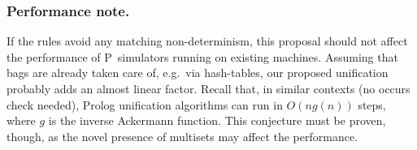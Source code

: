 \subsubsection{Performance note.}
If the rules avoid any matching non-determinism, 
this proposal should not affect the performance of P~simulators running on existing machines.
Assuming that bags are already taken care of, e.g.~via hash-tables,
our proposed unification probably adds an almost linear factor.
Recall that, in similar contexts (no occurs check needed), 
Prolog unification algorithms can run in \(O(n g(n))\) steps,
where \(g\) is the inverse Ackermann function.
This conjecture must be proven, though, 
as the novel presence of multisets may affect the performance.

